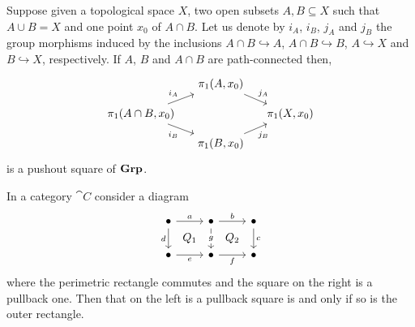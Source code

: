 \begin{example}
Suppose given a topological space \(X\), two open subsets \(A, B \subseteq X\) such that \(A \cup B = X\) and one point \(x_0\) of \(A \cap B\). Let us denote by \(i_A\), \(i_B\), \(j_A\) and \(j_B\) the group morphisms induced by the inclusions \(A \cap B \hookrightarrow A\), \(A \cap B \hookrightarrow B\), \(A \hookrightarrow X\) and \(B \hookrightarrow X\), respectively. If \(A\), \(B\) and \(A \cap B\) are path-connected then,
\[\begin{tikzcd}[sep=small]
 & \pi_1(A, x_0) \ar["{j_A}", dr] & \\
\pi_1(A \cap B, x_0) \ar["{i_A}", ur] \ar["{i_B}", dr, swap] & & \pi_1(X, x_0) \\
 & \pi_1(B, x_0) \ar["{j_B}", ur, swap]
\end{tikzcd}\]
is a pushout square of \(\mathbf{Grp}\).
\end{example}


\begin{proposition}
In a category \(\cat C\) consider a diagram
\[\begin{tikzcd}
\bullet \ar["a", r] \ar["d", d, swap] \ar["{Q_1}", dr, phantom] & \bullet \ar["b", r] \ar["g" description, d] \ar["{Q_2}", dr, phantom] & \bullet \ar["c", d]\\
\bullet \ar["e", r, swap] & \bullet \ar["f", r, swap] & \bullet
\end{tikzcd}\]
where the perimetric rectangle commutes and the square on the right is a pullback one. Then that on the left is a pullback square is and only if so is the outer rectangle. 
\end{proposition}

